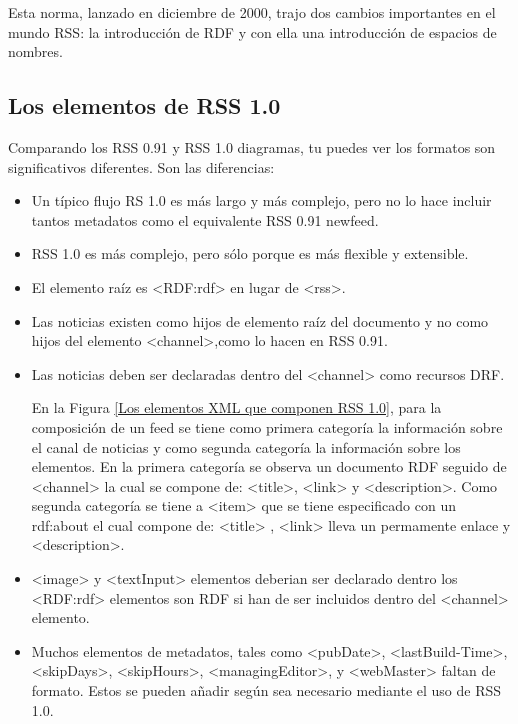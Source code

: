 Esta norma, lanzado en diciembre de 2000, trajo dos cambios importantes en el 
mundo RSS: la introducci\'{o}n de RDF y con ella una introducci\'{o}n de espacios
de nombres.\cite{hammersley2005developing}
 
\subsection{Los elementos de RSS 1.0}

Comparando los RSS 0.91 y RSS 1.0 diagramas, tu puedes ver los formatos son significativos
diferentes. Son las diferencias:

\begin{itemize}

\item Un típico flujo RS 1.0 es más largo y más complejo, pero no lo hace incluir
tantos metadatos como el equivalente RSS 0.91 newfeed.

\item RSS 1.0 es más complejo, pero sólo porque es más flexible y extensible.

\item El elemento raíz es <RDF:rdf>  en lugar de <rss>.

\item Las noticias existen como hijos de elemento raíz del documento y no como 
hijos del elemento <channel>,como lo hacen en RSS 0.91.

\item Las noticias deben ser declaradas dentro del <channel> como recursos DRF. \par

En la Figura \ref{Los elementos XML que componen RSS 1.0}, para la composici\'{o}n
de un feed se tiene como primera categor\'{i}a la informaci\'{o}n sobre el canal 
de noticias y como segunda categor\'{i}a la informaci\'{o}n sobre los elementos.
En la primera  categor\'{i}a se observa un documento RDF seguido de <channel> la
cual se compone de: <title>, <link> y <description>. Como segunda categor\'{i}a 
se tiene a <item> que se tiene especificado con un rdf:about el cual compone de:
<title> , <link> lleva un permamente enlace y <description>. 

\begin{minipage}{1.0\linewidth}
	\centering
	\label{Los elementos XML que componen RSS 1.0}
\end{minipage}

\item <image> y <textInput> elementos deberian ser declarado dentro los <RDF:rdf>
elementos son RDF si han de ser incluidos dentro del <channel> elemento.

\item Muchos elementos de metadatos, tales como  <pubDate>, <lastBuild-Time>, 
<skipDays>, <skipHours>, <managingEditor>, y <webMaster> faltan de formato.
Estos se pueden a\~{n}adir seg\'{u}n sea necesario mediante el uso de RSS 1.0.
\cite{johnson2006rss}

\end{itemize}

